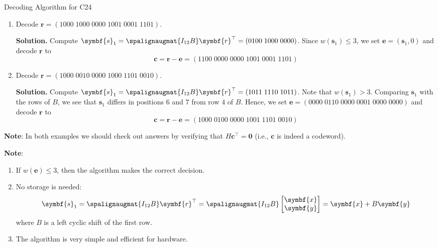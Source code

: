 \begin{Example}{Decoding Algorithm for C24}{}
    \begin{enumerate}
        \item Decode $ \symbf{r}=(1000\; 1000\; 0000\; 1001\; 0001\; 1101) $.

              \textbf{Solution.} Compute $ \symbf{s}_1=\spalignaugmat{I_{12} B}\symbf{r}^\top=
                  (0100\; 1000\; 0000) $. Since $ w(\symbf{s}_1)\leqslant 3 $, we set
              $ \symbf{e}=(\symbf{s}_1,0) $ and decode $ \symbf{r} $ to
              \[ \symbf{c}=\symbf{r}-\symbf{e}=(1100\; 0000\; 0000\; 1001\; 0001\; 1101) \]

        \item Decode $ \symbf{r}=(1000\; 0010\; 0000\; 1000\; 1101\; 0010) $.

              \textbf{Solution.} Compute $ \symbf{s}_1=\spalignaugmat{I_{12} B}\symbf{r}^\top=
                  (1011\; 1110\; 1011) $. Note that $ w(\symbf{s}_1)>3 $. Comparing $ \symbf{s}_1 $
              with the rows of $ B $, we see that $ \symbf{s}_1 $ differs in positions $ 6 $
              and $ 7 $ from row $ 4 $ of $ B $. Hence, we set $ \symbf{e}=(0000\; 0110\; 0000\; 0001\; 0000\; 0000) $
              and decode $ \symbf{r} $ to
              \[ \symbf{c}=\symbf{r}-\symbf{e}=(1000\; 0100\; 0000\; 1001\; 1101\; 0010) \]
    \end{enumerate}

    \textbf{Note}: In both examples we should check out answers by verifying that $ H\symbf{c}^\top=\symbf{0} $
    (i.e., $ \symbf{c} $ is indeed a codeword).
\end{Example}


\textbf{Note}:
\begin{enumerate}[label=(\arabic*)]
    \item If $ w(\symbf{e})\leqslant 3 $, then the algorithm makes the correct decision.
    \item No storage is needed:
          \[ \symbf{s}_1=\spalignaugmat{I_{12} B}\symbf{r}^\top=\spalignaugmat{I_{12} B}
              \begin{bmatrix}
                  \symbf{x} \\
                  \symbf{y}
              \end{bmatrix}=\symbf{x}+B\symbf{y} \]
          where $ B $ is a left cyclic shift of the first row.
    \item The algorithm is very simple and efficient for hardware.
\end{enumerate}

